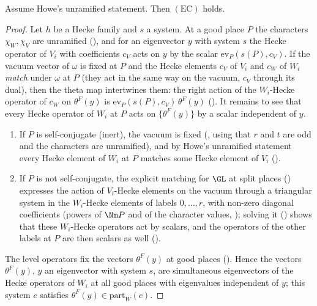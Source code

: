 \begin{lemma}\label{pf:stageU:downeig}
Assume Howe's unramified statement. Then $(\mathrm{EC})$ holds.
\end{lemma}

\begin{proof}
Let $h$ be a Hecke family and $s$ a system. At a good place $P$ the characters $\chi_W,\chi_V$ are unramified
(), and for an eigenvector $y$ with system $s$ the Hecke operator
of $V_i$ with coefficients $c_V$ acts on $y$ by the scalar $\mathrm{ev}_P(s(P),c_V)$. If the vacuum vector of $\omega$ is fixed at $P$
and the Hecke elements $c_V$ of $V_i$ and $c_W$ of $W_i$ \emph{match} under $\omega$ at $P$ (they act in the same way on the
vacuum, $c_V$ through its dual), then the theta map intertwines them: the right action of the $W_i$-Hecke operator of $c_W$
on $\theta^F(y)$ is $\mathrm{ev}_P(s(P),c_V)\,\theta^F(y)$ (). It remains to see that every
Hecke operator of $W_i$ at $P$ acts on $\{\theta^F(y)\}$ by a scalar independent of $y$.
\begin{enumerate}[label=(\roman*)]
\item If $P$ is self-conjugate (inert), the vacuum is fixed (, using that $r$ and
$t$ are odd and the characters are unramified), and by Howe's unramified statement every Hecke element of $W_i$ at $P$ matches
some Hecke element of $V_i$ ().
\item If $P$ is not self-conjugate, the explicit matching for $\GL$ at split places
() expresses the action of $V_i$-Hecke elements on the vacuum through a
triangular system in the $W_i$-Hecke elements of labels $0,\dots,r$, with non-zero diagonal coefficients (powers of $\Nm P$ and
of the character values, ); solving it
() shows that these $W_i$-Hecke operators act by scalars, and the operators of the
other labels at $P$ are then scalars as well ().
\end{enumerate}
The level operators fix the vectors $\theta^F(y)$ at good places (). Hence the
vectors $\theta^F(y)$, $y$ an eigenvector with system $s$, are simultaneous eigenvectors of the Hecke operators of $W_i$ at all good
places with eigenvalues independent of $y$; this system $c$ satisfies $\theta^F(y)\in\mathrm{part}_W(c)$.
\end{proof}

